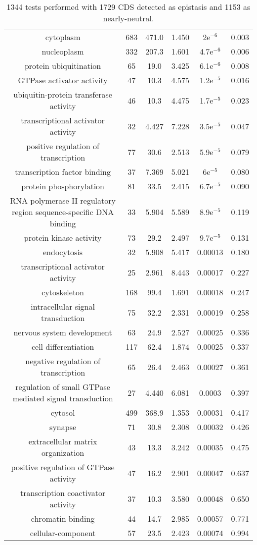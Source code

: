 \documentclass[USLetter,5pt]{article}
\begin{document}
\begin{table}[ht]
\begin{adjustbox}{width = 1\textwidth}
\begin{tabular}{|c|c|c|c|c|c|}
cytoplasm & 683 &  471.0 &  1.450 &   2e$^{-6}$ &  0.003\\
nucleoplasm & 332 &  207.3 &  1.601 & 4.7e$^{-6}$ &  0.006\\
protein ubiquitination & 65 &   19.0 &  3.425 & 6.1e$^{-6}$ &  0.008\\
GTPase activator activity & 47 &   10.3 &  4.575 & 1.2e$^{-5}$ &  0.016\\
ubiquitin-protein transferase activity & 46 &   10.3 &  4.475 & 1.7e$^{-5}$ &  0.023\\
transcriptional activator activity & 32 &  4.427 &  7.228 & 3.5e$^{-5}$ &  0.047\\
positive regulation of transcription & 77 &   30.6 &  2.513 & 5.9e$^{-5}$ &  0.079\\
transcription factor binding & 37 &  7.369 &  5.021 &   6e$^{-5}$ &  0.080\\
protein phosphorylation & 81 &   33.5 &  2.415 & 6.7e$^{-5}$ &  0.090\\
RNA polymerase II regulatory region sequence-specific DNA binding & 33 &  5.904 &  5.589 & 8.9e$^{-5}$ &  0.119\\
protein kinase activity & 73 &   29.2 &  2.497 & 9.7e$^{-5}$ &  0.131\\
endocytosis & 32 &  5.908 &  5.417 & 0.00013 &  0.180\\
transcriptional activator activity & 25 &  2.961 &  8.443 & 0.00017 &  0.227\\
cytoskeleton & 168 &   99.4 &  1.691 & 0.00018 &  0.247\\
intracellular signal transduction & 75 &   32.2 &  2.331 & 0.00019 &  0.258\\
nervous system development & 63 &   24.9 &  2.527 & 0.00025 &  0.336\\
cell differentiation & 117 &   62.4 &  1.874 & 0.00025 &  0.337\\
negative regulation of transcription & 65 &   26.4 &  2.463 & 0.00027 &  0.361\\
regulation of small GTPase mediated signal transduction & 27 &  4.440 &  6.081 & 0.0003 &  0.397\\
cytosol & 499 &  368.9 &  1.353 & 0.00031 &  0.417\\
synapse & 71 &   30.8 &  2.308 & 0.00032 &  0.426\\
extracellular matrix organization & 43 &   13.3 &  3.242 & 0.00035 &  0.475\\
positive regulation of GTPase activity & 47 &   16.2 &  2.901 & 0.00047 &  0.637\\
transcription coactivator activity & 37 &   10.3 &  3.580 & 0.00048 &  0.650\\
chromatin binding & 44 &   14.7 &  2.985 & 0.00057 &  0.771\\
cellular-component & 57 &   23.5 &  2.423 & 0.00074 &  0.994\\
\hline
\end{tabular}
\end{adjustbox}
\caption{1344 tests performed with 1729 CDS detected as epistasis and 1153 as nearly-neutral.
}
\end{table}
\end{document}
